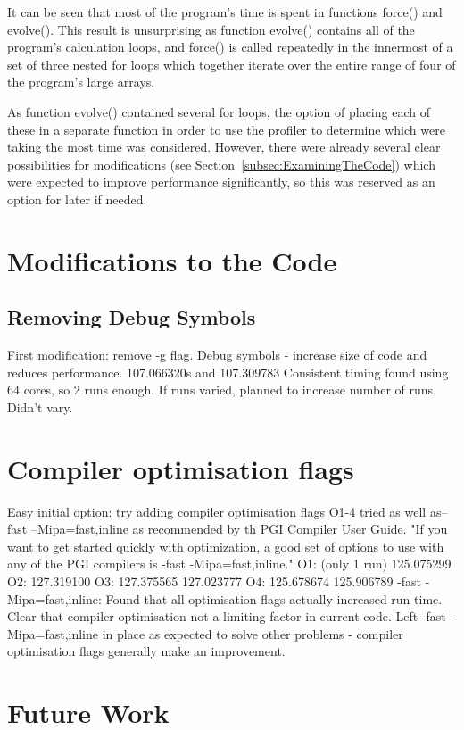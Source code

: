 \documentclass[11pt, oneside]{article}   %
\begin{document}
It can be seen that most of the program's time is spent in functions force() and evolve().
This result is unsurprising as function evolve() contains all of the program's calculation loops, and force() is called repeatedly in the innermost of a set of three nested for loops which together iterate over the entire range of four of the program's large arrays.

As function evolve() contained several for loops, the option of placing each of these in a separate function in order to use the profiler to determine which were taking the most time was considered.
However, there were already several clear possibilities for modifications (see Section~\ref{subsec:ExaminingTheCode}) which were expected to improve performance significantly, so this was reserved as an option for later if needed.

\section{Modifications to the Code}

\subsection{Removing Debug Symbols}
First modification: remove -g flag.
Debug symbols - increase size of code and reduces performance.
107.066320s and 107.309783 
Consistent timing found using 64 cores, so 2 runs enough.
If runs varied, planned to increase number of runs.  Didn't vary.

\section{Compiler optimisation flags}
Easy initial option: try adding compiler optimisation flags  O1-4 tried as well as–fast –Mipa=fast,inline  as recommended by th PGI Compiler User Guide. \cite{ref:PgiCC}  "If you want to get started quickly with optimization, a good set of options to use with any of the PGI compilers is -fast -Mipa=fast,inline."
O1: (only 1 run) 125.075299
O2: 127.319100
O3: 127.375565 127.023777
O4: 125.678674 125.906789
-fast -Mipa=fast,inline: 
Found that all optimisation flags actually increased run time.  Clear that compiler optimisation not a limiting factor in current code.
Left -fast -Mipa=fast,inline in place as expected to solve other problems - compiler optimisation flags generally make an improvement.

\section{Future Work}
\end{document}
